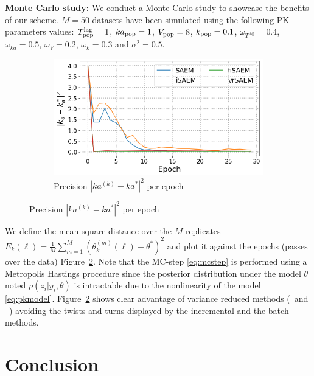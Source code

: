 \documentclass[11pt]{article}
\theoremstyle{t}
\begin{document}
\textbf{Monte Carlo study:}
We conduct a Monte Carlo study to showcase the benefits of our scheme.
$M=50$ datasets have been simulated using the following PK parameters values:
$T^{\textrm{lag}}_{\rm pop} =1$, $ka_{\rm pop} =1$, $V_{\rm pop}= 8$, $k_{\rm pop}=0.1$, $ \omega_{T^{\textrm{lag}}}=0.4$, $\omega_{ka}=0.5$, $\omega_{V}=0.2$, $\omega_{k}=0.3$ and $\sigma^2=0.5$.
\begin{figure}
\begin{minipage}{0.5\textwidth}\vspace{-.5cm}
\begin{figure}[H]
\includegraphics[width=\textwidth]{pic_paper/pk500.png}\vspace{-.2cm}
\caption{Precision $|ka^{(k)} - ka^*|^2$ per epoch}\vspace{-.2cm}
\label{fig:pk_tts}
\end{figure}
\end{minipage}
\end{figure}
We define the mean square distance over the $M$ replicates $E_k(\ell) = \frac{1}{M}\sum_{m=1}^{M}{\left(\theta_k^{(m)}(\ell) - \theta^* \right)^2}$ and plot it against the epochs (passes over the data) Figure~\ref{fig:pk_tts}.	
Note that the {\sf MC-step} \eqref{eq:mcstep} is performed using a Metropolis Hastings procedure since the posterior distribution under the model $\theta$ noted $p(z_i | y_i, \theta)$ is intractable due to the nonlinearity of the model \eqref{eq:pkmodel}.
Figure~\ref{fig:pk_tts} shows clear advantage of variance reduced methods (\SAEMVR\ and \FISAEM\ ) avoiding the twists and turns displayed by the incremental and the batch methods.



\section{Conclusion}
\end{document}
